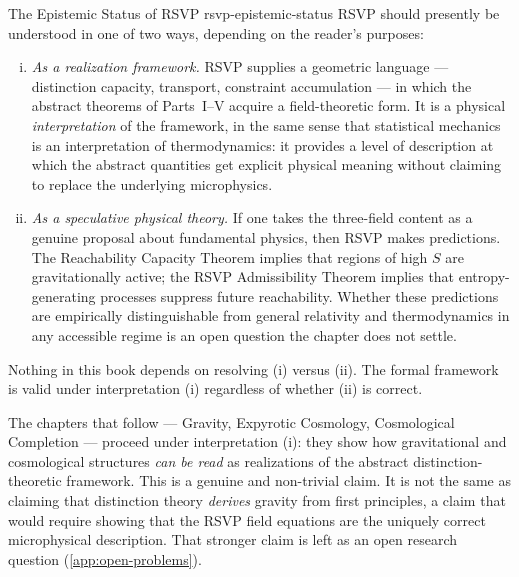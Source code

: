 \documentclass[12pt,twoside,openright]{book}
\begin{document}
\begin{remark}{The Epistemic Status of RSVP}%
  {rsvp-epistemic-status}
  RSVP should presently be understood in one of two
  ways, depending on the reader's purposes:
  \begin{enumerate}[(i)]
    \item \emph{As a realization framework.} RSVP supplies
          a geometric language --- distinction capacity,
          transport, constraint accumulation --- in which the
          abstract theorems of Parts~I--V acquire a
          field-theoretic form. It is a physical
          \emph{interpretation} of the framework, in the
          same sense that statistical mechanics is an
          interpretation of thermodynamics: it provides a
          level of description at which the abstract
          quantities get explicit physical meaning without
          claiming to replace the underlying microphysics.
    \item \emph{As a speculative physical theory.} If one
          takes the three-field content as a genuine
          proposal about fundamental physics, then RSVP
          makes predictions. The Reachability Capacity
          Theorem implies that regions of high $S$ are
          gravitationally active; the RSVP Admissibility
          Theorem implies that entropy-generating processes
          suppress future reachability. Whether these
          predictions are empirically distinguishable from
          general relativity and thermodynamics in any
          accessible regime is an open question the
          chapter does not settle.
  \end{enumerate}
  Nothing in this book depends on resolving (i) versus (ii).
  The formal framework is valid under interpretation (i)
  regardless of whether (ii) is correct.
\end{remark}

The chapters that follow --- Gravity, Expyrotic Cosmology,
Cosmological Completion --- proceed under interpretation
(i): they show how gravitational and cosmological
structures \emph{can be read} as realizations of the
abstract distinction-theoretic framework. This is a
genuine and non-trivial claim. It is not the same as
claiming that distinction theory \emph{derives} gravity
from first principles, a claim that would require showing
that the RSVP field equations are the uniquely correct
microphysical description. That stronger claim is left as
an open research question (\cref{app:open-problems}).

\end{document}
